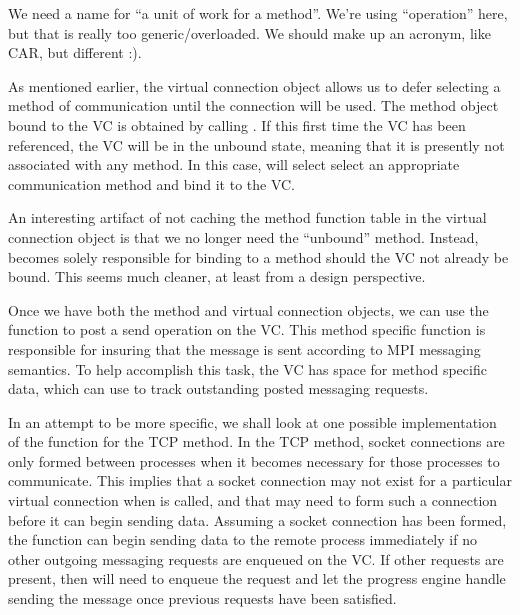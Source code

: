 \begin{cmt}
  We need a name for ``a unit of work for a method''.  We're using
  ``operation'' here, but that is really too generic/overloaded.  We should
  make up an acronym, like CAR, but different :).
\end{cmt}

As mentioned earlier, the virtual connection object allows us to defer
selecting a method of communication until the connection will be used.  The
method object bound to the VC is obtained by calling
.  If this first time the VC has been referenced,
the VC will be in the unbound state, meaning that it is presently not
associated with any method.  In this case,  will
select select an appropriate communication method and bind it to the VC.

\begin{cmt}
  An interesting artifact of not caching the method function table in the
  virtual connection object is that we no longer need the ``unbound'' method.
  Instead,  becomes solely responsible for binding to
  a method should the VC not already be bound.  This seems much cleaner, at
  least from a design perspective.
\end{cmt}

Once we have both the method and virtual connection objects, we can use the
 function to post a send operation on the VC.  This
method specific function is responsible for insuring that the message is sent
according to MPI messaging semantics.  To help accomplish this task, the VC has
space for method specific data, which  can use to track
outstanding posted messaging requests.

In an attempt to be more specific, we shall look at one possible
implementation of the  function for the TCP method.  In the TCP
method, socket connections are only formed between processes when it becomes
necessary for those processes to communicate.  This implies that a socket
connection may not exist for a particular virtual connection when
 is called, and that  may need to form such a
connection before it can begin sending data.  Assuming a socket connection has
been formed, the  function can begin sending data to the remote
process immediately if no other outgoing messaging requests are enqueued on the
VC.  If other requests are present, then  will need to enqueue
the request and let the progress engine handle sending the message once
previous requests have been satisfied.

